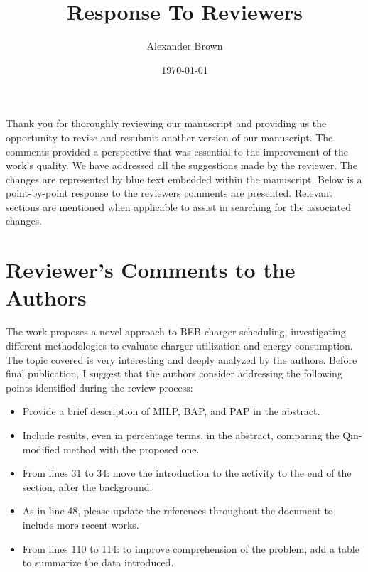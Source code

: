 \documentclass[11pt,a4paper,final]{article}
\author{Alexander Brown}
\date{\today}
\title{Response To Reviewers}
\begin{document}
\maketitle

Thank you for thoroughly reviewing our manuscript and providing us the opportunity to revise and resubmit another
version of our manuscript. The comments provided a perspective that was essential to the improvement of the work's
quality. We have addressed all the suggestions made by the reviewer. The changes are represented by blue text
embedded within the manuscript. Below is a point-by-point response to the reviewers comments are presented. Relevant
sections are mentioned when applicable to assist in searching for the associated changes.

\section{Reviewer's Comments to the Authors}
The work proposes a novel approach to BEB charger scheduling, investigating different methodologies to evaluate charger utilization and energy consumption. The topic covered is very interesting and deeply analyzed by the authors.
Before final publication, I suggest that the authors consider addressing the following points identified during the review process:

\begin{itemize}
  \item Provide a brief description of MILP, BAP, and PAP in the abstract.
\end{itemize}

\begin{itemize}
\item Include results, even in percentage terms, in the abstract, comparing the Qin-modified method with the proposed one.
\end{itemize}

\begin{itemize}
\item From lines 31 to 34: move the introduction to the activity to the end of the section, after the background.
\end{itemize}

\begin{itemize}
\item As in line 48, please update the references throughout the document to include more recent works.
\end{itemize}

\begin{itemize}
\item From lines 110 to 114: to improve comprehension of the problem, add a table to summarize the data introduced.
\end{itemize}
\end{document}
